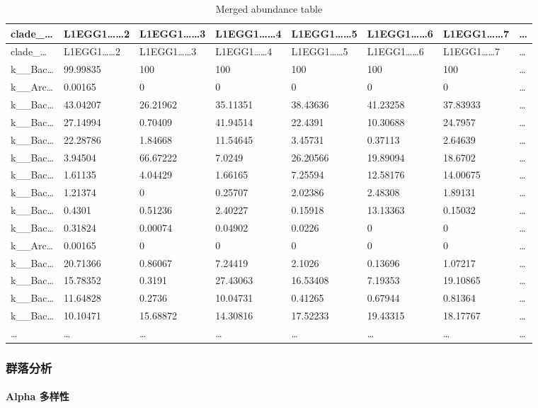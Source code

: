\documentclass[
]{article}
\begin{document}
\begin{longtable}[]{@{}llllllll@{}}
\caption{\label{tab:Merged-abundance-table}Merged abundance table}\tabularnewline
\toprule
clade\_\ldots{} & L1EGG1\ldots\ldots2 & L1EGG1\ldots\ldots3 & L1EGG1\ldots\ldots4 & L1EGG1\ldots\ldots5 & L1EGG1\ldots\ldots6 & L1EGG1\ldots\ldots7 & \ldots{}\tabularnewline
\midrule
\endfirsthead
\toprule
clade\_\ldots{} & L1EGG1\ldots\ldots2 & L1EGG1\ldots\ldots3 & L1EGG1\ldots\ldots4 & L1EGG1\ldots\ldots5 & L1EGG1\ldots\ldots6 & L1EGG1\ldots\ldots7 & \ldots{}\tabularnewline
\midrule
\endhead
k\_\_Bac\ldots{} & 99.99835 & 100 & 100 & 100 & 100 & 100 & \ldots{}\tabularnewline
k\_\_Arc\ldots{} & 0.00165 & 0 & 0 & 0 & 0 & 0 & \ldots{}\tabularnewline
k\_\_Bac\ldots{} & 43.04207 & 26.21962 & 35.11351 & 38.43636 & 41.23258 & 37.83933 & \ldots{}\tabularnewline
k\_\_Bac\ldots{} & 27.14994 & 0.70409 & 41.94514 & 22.4391 & 10.30688 & 24.7957 & \ldots{}\tabularnewline
k\_\_Bac\ldots{} & 22.28786 & 1.84668 & 11.54645 & 3.45731 & 0.37113 & 2.64639 & \ldots{}\tabularnewline
k\_\_Bac\ldots{} & 3.94504 & 66.67222 & 7.0249 & 26.20566 & 19.89094 & 18.6702 & \ldots{}\tabularnewline
k\_\_Bac\ldots{} & 1.61135 & 4.04429 & 1.66165 & 7.25594 & 12.58176 & 14.00675 & \ldots{}\tabularnewline
k\_\_Bac\ldots{} & 1.21374 & 0 & 0.25707 & 2.02386 & 2.48308 & 1.89131 & \ldots{}\tabularnewline
k\_\_Bac\ldots{} & 0.4301 & 0.51236 & 2.40227 & 0.15918 & 13.13363 & 0.15032 & \ldots{}\tabularnewline
k\_\_Bac\ldots{} & 0.31824 & 0.00074 & 0.04902 & 0.0226 & 0 & 0 & \ldots{}\tabularnewline
k\_\_Arc\ldots{} & 0.00165 & 0 & 0 & 0 & 0 & 0 & \ldots{}\tabularnewline
k\_\_Bac\ldots{} & 20.71366 & 0.86067 & 7.24419 & 2.1026 & 0.13696 & 1.07217 & \ldots{}\tabularnewline
k\_\_Bac\ldots{} & 15.78352 & 0.3191 & 27.43063 & 16.53408 & 7.19353 & 19.10865 & \ldots{}\tabularnewline
k\_\_Bac\ldots{} & 11.64828 & 0.2736 & 10.04731 & 0.41265 & 0.67944 & 0.81364 & \ldots{}\tabularnewline
k\_\_Bac\ldots{} & 10.10471 & 15.68872 & 14.30816 & 17.52233 & 19.43315 & 18.17767 & \ldots{}\tabularnewline
\ldots{} & \ldots{} & \ldots{} & \ldots{} & \ldots{} & \ldots{} & \ldots{} & \ldots{}\tabularnewline
\bottomrule
\end{longtable}

\hypertarget{ux7fa4ux843dux5206ux6790}{%
\subsubsection{群落分析}\label{ux7fa4ux843dux5206ux6790}}

\hypertarget{alpha}{%
\paragraph{Alpha 多样性}\label{alpha}}
\end{document}
